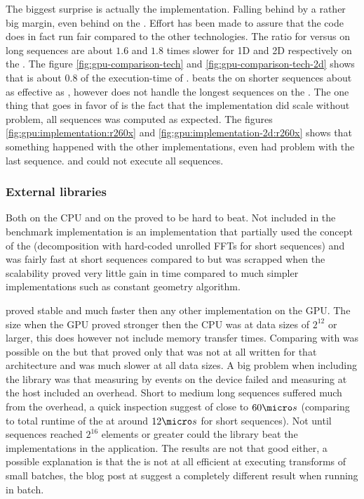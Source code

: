 The biggest surprise is actually the {\OCL} implementation. Falling behind by a rather big margin, even behind on the \AMDCARD. Effort has been made to assure that the code does in fact run fair compared to the other technologies. The ratio for {\OCL} versus {\CU} on long sequences are about $1.6$ and $1.8$ times slower for 1D and 2D respectively on the {\NVCARD}. The figure \ref{fig:gpu-comparison-tech} and \ref{fig:gpu-comparison-tech-2d} shows that {\DX} is about $0.8$ of the execution-time of {\OCL}. {\GL} beats the {\OCL} on shorter sequences about as effective as {\DX}, however does not handle the longest sequences on the {\AMDCARD}. The one thing that goes in favor of {\OCL} is the fact that the implementation did scale without problem, all sequences was computed as expected. The figures \ref{fig:gpu:implementation:r260x} and \ref{fig:gpu:implementation-2d:r260x} shows that something happened with the other implementations, even {\CLFFT} had problem with the last sequence. {\GL} and {\DX} could not execute all sequences.

\subsubsection{External libraries}

Both {\FFTW} on the CPU and {\CUFFT} on the {\NVCARD} proved to be hard to beat. Not included in the benchmark implementation is an {\CPP} implementation that partially used the concept of the {\FFTW} (decomposition with hard-coded unrolled FFTs for short sequences) and was fairly fast at short sequences compared to {\FFTW} but was scrapped when the scalability proved very little gain in time compared to much simpler implementations such as constant geometry algorithm.

{\CUFFT} proved stable and much faster then any other implementation on the GPU. The size when the GPU proved stronger then the CPU was at data sizes of $2^{12}$ or larger, this does however not include memory transfer times. Comparing {\CUFFT} with {\CLFFT} was possible on the {\NVCARD} but that proved only that {\CLFFT} was not at all written for that architecture and was much slower at all data sizes. A big problem when including the {\CLFFT} library was that measuring by events on the device failed and measuring at the host included an overhead. Short to medium long sequences suffered much from the overhead, a quick inspection suggest of close to $60{\micro}s$ (comparing to total runtime of the {\OCL} at around $12{\micro}s$ for short sequences). Not until sequences reached $2^16$ elements or greater could the library beat the implementations in the application. The results are not that good either, a possible explanation is that the {\CLFFT} is not at all efficient at executing transforms of small batches, the blog post at \cite{amd2015performance} suggest a completely different result when running in batch.

